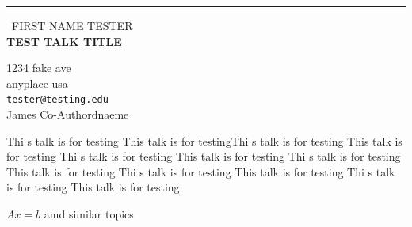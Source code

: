 \documentclass{report}
\begin{document}
\begin{center}
\rule{6in}{1pt} \
{\large FIRST NAME TESTER \\
{\bf TEST TALK TITLE}}

1234 fake ave \\ anyplace usa
\\
{\tt tester@testing.edu}\\
James Co-Authordnaeme \end{center}

Thi s talk is for testing
This talk is for testingThi s talk is for testing
This talk is for testing
Thi s talk is for testing
This talk is for testing
Thi s talk is for testing
This talk is for testing
Thi s talk is for testing
This talk is for testing
Thi s talk is for testing
This talk is for testing

$Ax = b$ amd similar topics
\end{document}
